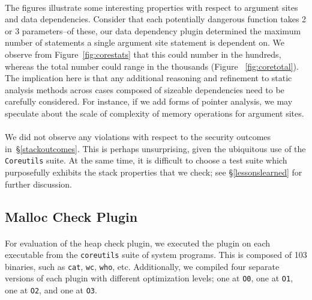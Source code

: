 \documentclass[letterpaper,11pt]{article}
\begin{document}
\paragraph{}
The figures illustrate some interesting properties with respect to argument
sites and data dependencies. Consider that each potentially dangerous function
takes 2 or 3 parameters--of these, our data dependency plugin determined the
maximum number of statements a single argument site statement is dependent on.
We observe from Figure~\ref{fig:corestats} that this could number in the hundreds,
whereas the total number could range in the thousands (Figure ~\ref{fig:coretotal}).
The implication here is that any additional reasoning and refinement to static
analysis methods across cases composed of sizeable dependencies need to be
carefully considered. For instance, if we add forms of pointer analysis,
we may speculate about the scale of complexity of memory operations for
argument sites.

\paragraph{}
We did not observe any violations with respect to the security outcomes
in~\S\ref{stackoutcomes}. This is perhaps unsurprising, given the ubiquitous
use of the \texttt{Coreutils} suite. At the same time, it is difficult to
choose a test suite which purposefully exhibits the stack properties that we
check; see \S\ref{lessonslearned} for further discussion.

\subsection{Malloc Check Plugin}
\paragraph{}
For evaluation of the heap check plugin, we executed the plugin on each
executable from the \texttt{coreutils} suite of system programs. This is composed of
103 binaries, such as \texttt{cat}, \texttt{wc}, \texttt{who}, etc. Additionally, we compiled four
separate versions of each plugin with different optimization levels; one at
\texttt{O0}, one at \texttt{O1}, one at \texttt{O2}, and one at \texttt{O3}.
\end{document}
